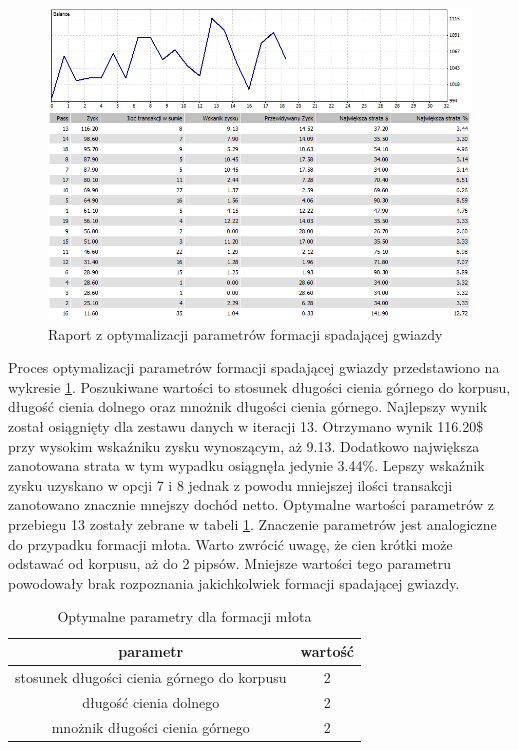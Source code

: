 \documentclass[pdflatex,11pt]{aghdpl}
\begin{document}
\begin{figure}[h!]
\begin{center}
\includegraphics[width=14cm]{shootingstar/optymalizacja.png}
\caption{Raport z optymalizacji parametrów formacji spadającej gwiazdy}
\label{opt_gwiazda}
\end{center}
\end{figure} 
Proces optymalizacji parametrów formacji spadającej gwiazdy przedstawiono na wykresie \ref{opt_gwiazda}. Poszukiwane wartości to stosunek długości cienia górnego do korpusu, długość cienia dolnego oraz mnożnik długości cienia górnego. Najlepszy wynik został osiągnięty dla zestawu danych w iteracji 13. Otrzymano wynik 116.20\$ przy wysokim wskaźniku zysku wynoszącym, aż 9.13. Dodatkowo największa zanotowana strata w tym wypadku osiągnęła jedynie 3.44\%. Lepszy wskaźnik zysku uzyskano w opcji 7 i 8 jednak z powodu mniejszej ilości transakcji zanotowano znacznie mnejszy dochód netto. Optymalne wartości parametrów z przebiegu 13 zostały zebrane w tabeli \ref{parametry_gwiazda}. Znaczenie parametrów jest analogiczne do przypadku formacji młota. Warto zwrócić uwagę, że cien krótki może odstawać od korpusu, aż do 2 pipsów. Mniejsze wartości tego parametru powodowały brak rozpoznania jakichkolwiek formacji spadającej gwiazdy.
\begin{table}[h!]
\begin{center}
\begin{tabular}{|c|c|}
\hline 
parametr & wartość \\
\hline
stosunek długości cienia górnego do korpusu & 2\\
\hline
długość cienia dolnego & 2\\
\hline
mnożnik długości cienia górnego & 2\\
\hline
\end{tabular} 
\caption{Optymalne parametry dla formacji młota}
\label{parametry_gwiazda}
\end{center}
\end{table}
\end{document}

